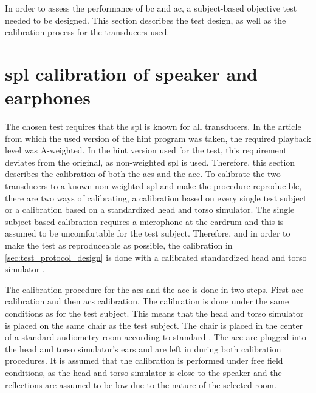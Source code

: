 \label{sec:test_description}
In order to assess the performance of \gls{bc} and \gls{ac}, a subject-based objective test needed to be designed. This section describes the test design, as well as the calibration process for the transducers used.






\section{\gls{spl} calibration of speaker and earphones}\label{sec:cal}
The chosen test requires that the \gls{spl} is known for all transducers. In the article from which the used version of the \gls{hint} program was taken, the required playback level was A-weighted. In the \gls{hint} version used for the test, this requirement deviates from the original, as non-weighted \gls{spl} is used. Therefore, this section describes the calibration of both the \gls{acs} and the \gls{ace}. To calibrate the two transducers to a known non-weighted \gls{spl} and make the procedure reproducible, there are two ways of calibrating, a calibration based on every single test subject or a calibration based on a standardized head and torso simulator. The single subject based calibration requires a microphone at the eardrum \citep{iso_11904-1} and this is assumed to be uncomfortable for the test subject. Therefore, and in order to make the test as reproduceable as possible, the calibration in \autoref{sec:test_protocol_design} is done with a calibrated standardized head and torso simulator \citep{iso_11904-2}.

The calibration procedure for the \gls{acs} and the \gls{ace} is done in two steps. First \gls{ace} calibration and then \gls{acs} calibration. The calibration is done under the same conditions as for the test subject. This means that the head and torso simulator is placed on the same chair as the test subject. The chair is placed in the center of a standard audiometry room according to standard \citep{iso_8253-2}. The \gls{ace} are plugged into the head and torso simulator's ears and are left in during both calibration procedures. It is assumed that the calibration is performed under free field conditions, as the head and torso simulator is close to the speaker and the reflections are assumed to be low due to the nature of the selected room. 

